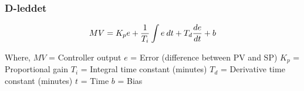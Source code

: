 \documentclass[aspectratio=169,xcolor=dvipsnames]{beamer}
\begin{document}
%
% 
% 
\begin{frame}
	\frametitle{D-leddet}


$$MV = K_p e + {1 \over T_i} \int e \> dt + T_d {de \over dt} + b$$

Where,
\vskip 5pt 
$MV$ = Controller output
\vskip 5pt 
$e$ = Error (difference between PV and SP)
\vskip 5pt 
$K_p$ = Proportional gain
\vskip 5pt 
$T_i$ = Integral time constant (minutes)
\vskip 5pt 
$T_d$ = Derivative time constant (minutes)
\vskip 5pt 
$t$ = Time
\vskip 5pt 
$b$ = Bias
\end{frame}
%
%
%
\end{document}
